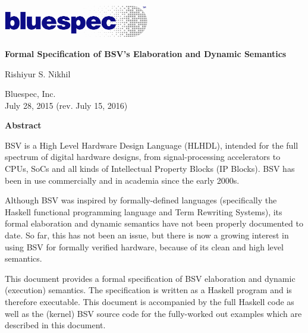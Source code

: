 \documentclass[11pt]{article}
\newcommand{\hm}{\hspace*{1em}}
\newlength{\hlessmm}
\begin{document}

\begin{center}

\centerline{\includegraphics[width=2.5in,angle=0]{Figures/Fig_Logo_2color_on_white}}

\vspace{2ex}

{\Large\bf Formal Specification of BSV's Elaboration and Dynamic Semantics}

\vspace{1ex}

Rishiyur S. Nikhil

\vspace{1ex}

Bluespec, Inc. \\
July 28, 2015 (rev. July 15, 2016)

\end{center}


\begin{center}
\begin{minipage}{\hlessmm}
\begin{center}
\bf Abstract
\end{center}

BSV is a High Level Hardware Design Language (HLHDL), intended for the
full spectrum of digital hardware designs, from signal-processing
accelerators to CPUs, SoCs and all kinds of Intellectual Property
Blocks (IP Blocks).  BSV has been in use commercially and in academia
since the early 2000s.

\hm Although BSV was inspired by formally-defined languages
(specifically the Haskell functional programming language and Term
Rewriting Systems), its formal elaboration and dynamic semantics have
not been properly documented to date.  So far, this has not been an
issue, but there is now a growing interest in using BSV for formally
verified hardware, because of its clean and high level semantics.

\hm This document provides a formal specification of BSV elaboration
and dynamic (execution) semantics. The specification is written as a
Haskell program and is therefore executable.  This document is
accompanied by the full Haskell code as well as the (kernel) BSV
source code for the fully-worked out examples which are described in
this document.

\end{minipage}
\end{center}
\end{document}
